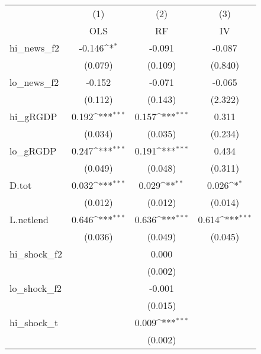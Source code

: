 {
\def\sym#1{\ifmmode^{#1}\else\(^{#1}\)\fi}
\begin{tabular}{l*{3}{c}}
\toprule
            &\multicolumn{1}{c}{(1)}&\multicolumn{1}{c}{(2)}&\multicolumn{1}{c}{(3)}\\
            &\multicolumn{1}{c}{OLS}&\multicolumn{1}{c}{RF}&\multicolumn{1}{c}{IV}\\
\midrule
hi\_news\_f2  &      -0.146\sym{*}  &      -0.091         &      -0.087         \\
            &     (0.079)         &     (0.109)         &     (0.840)         \\
\addlinespace
lo\_news\_f2  &      -0.152         &      -0.071         &      -0.065         \\
            &     (0.112)         &     (0.143)         &     (2.322)         \\
\addlinespace
hi\_gRGDP    &       0.192\sym{***}&       0.157\sym{***}&       0.311         \\
            &     (0.034)         &     (0.035)         &     (0.234)         \\
\addlinespace
lo\_gRGDP    &       0.247\sym{***}&       0.191\sym{***}&       0.434         \\
            &     (0.049)         &     (0.048)         &     (0.311)         \\
\addlinespace
D.tot       &       0.032\sym{***}&       0.029\sym{**} &       0.026\sym{*}  \\
            &     (0.012)         &     (0.012)         &     (0.014)         \\
\addlinespace
L.netlend   &       0.646\sym{***}&       0.636\sym{***}&       0.614\sym{***}\\
            &     (0.036)         &     (0.049)         &     (0.045)         \\
\addlinespace
hi\_shock\_f2 &                     &       0.000         &                     \\
            &                     &     (0.002)         &                     \\
\addlinespace
lo\_shock\_f2 &                     &      -0.001         &                     \\
            &                     &     (0.015)         &                     \\
\addlinespace
hi\_shock\_t  &                     &       0.009\sym{***}&                     \\
            &                     &     (0.002)         &                     \\

\end{tabular}}
